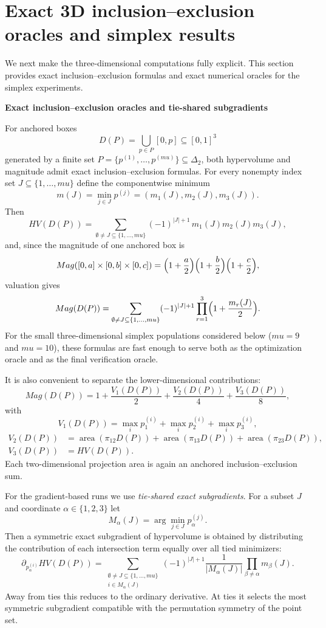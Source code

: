 \documentclass{article}
\def\mu{mu}%
\def\HV{HV}%
\def\Mag{Mag}%
\theoremstyle{definition}
\newcommand{\Mag}{\operatorname{Mag}}
\newcommand{\HV}{\operatorname{HV}}
\newcommand{\1}{\mathbf{1}}
\newcommand{\proj}{\pi}
\newcommand{\myparagraph}[1]{\medskip\noindent\textbf{#1}}
\begin{document}
\section{Exact 3D inclusion--exclusion oracles and simplex results}

We next make the three-dimensional computations fully explicit. This section provides exact inclusion--exclusion formulas and exact numerical oracles for the simplex experiments.

\myparagraph{Exact inclusion--exclusion oracles and tie-shared subgradients}

For anchored boxes
\[
D(P)=\bigcup_{p\in P}[0,p]\subseteq [0,1]^3
\]
generated by a finite set $P=\{p^{(1)},\dots,p^{(\mu)}\}\subseteq \Delta_2$, both hypervolume and magnitude admit exact inclusion--exclusion formulas. For every nonempty index set $J\subseteq\{1,\dots,\mu\}$ define the componentwise minimum
\[
m(J)=\min_{j\in J} p^{(j)}=(m_1(J),m_2(J),m_3(J)).
\]
Then
\[
\HV(D(P))
=
\sum_{\emptyset\ne J\subseteq\{1,\dots,\mu\}} (-1)^{|J|+1}\,m_1(J)m_2(J)m_3(J),
\]
and, since the magnitude of one anchored box is
\[
\Mag([0,a]\times[0,b]\times[0,c])=\Bigl(1+\frac a2\Bigr)\Bigl(1+\frac b2\Bigr)\Bigl(1+\frac c2\Bigr),
\]
valuation gives
\[
\Mag(D(P))=
\sum_{\emptyset\ne J\subseteq\{1,\dots,\mu\}} (-1)^{|J|+1}
\prod_{r=1}^3\Bigl(1+\frac{m_r(J)}{2}\Bigr).
\]
For the small three-dimensional simplex populations considered below ($\mu=9$ and $\mu=10$), these formulas are fast enough to serve both as the optimization oracle and as the final verification oracle.

It is also convenient to separate the lower-dimensional contributions:
\[
\Mag(D(P))=
1+\frac{V_1(D(P))}{2}+\frac{V_2(D(P))}{4}+\frac{V_3(D(P))}{8},
\]
with
\[
V_1(D(P))=\max_i p^{(i)}_1+\max_i p^{(i)}_2+\max_i p^{(i)}_3,
\]
\begin{align*}
V_2(D(P))&=\operatorname{area}(\proj_{12} D(P))
+\operatorname{area}(\proj_{13} D(P))
+\operatorname{area}(\proj_{23} D(P)),\\
V_3(D(P))&=\HV(D(P)).
\end{align*}
Each two-dimensional projection area is again an anchored inclusion--exclusion sum.

For the gradient-based runs we use \emph{tie-shared exact subgradients}. For a subset $J$ and coordinate $\alpha\in\{1,2,3\}$ let
\[
M_\alpha(J)=\arg\min_{j\in J} p^{(j)}_\alpha .
\]
Then a symmetric exact subgradient of hypervolume is obtained by distributing the contribution of each intersection term equally over all tied minimizers:
\[
\boxed{\;
\partial_{p^{(i)}_\alpha}\HV(D(P))
=
\sum_{\substack{\emptyset\ne J\subseteq\{1,\dots,\mu\}\\ i\in M_\alpha(J)}}
(-1)^{|J|+1}
\frac{1}{|M_\alpha(J)|}
\prod_{\beta\ne \alpha} m_\beta(J). \;}
\]
Away from ties this reduces to the ordinary derivative. At ties it selects the most symmetric subgradient compatible with the permutation symmetry of the point set.
\end{document}
